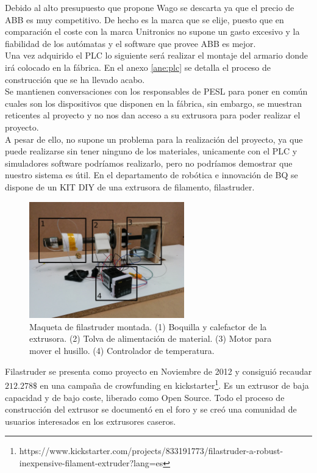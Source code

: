 Debido al alto presupuesto que propone Wago se descarta ya que el precio de ABB es muy competitivo. De hecho es la marca que se elije, puesto que en comparación el coste con la marca Unitronics no supone un gasto excesivo y la fiabilidad de los autómatas y el software que provee ABB es mejor.\\

Una vez adquirido el PLC lo siguiente será realizar el montaje del armario donde irá colocado en la fábrica. En el anexo \ref{ane:plc} se detalla el proceso de construcción que se ha llevado acabo.\\

Se mantienen conversaciones con los responsables de PESL para poner en común cuales son los dispositivos que disponen en la fábrica, sin embargo, se muestran reticentes al proyecto y no nos dan acceso a su extrusora para poder realizar el proyecto.\\

A pesar de ello, no supone un problema para la realización del proyecto, ya que puede realizarse sin tener ninguno de los materiales, unicamente con el PLC y simuladores software podríamos realizarlo, pero no podríamos demostrar que nuestro sistema es útil. En el departamento de robótica e innovación de BQ se dispone de un KIT DIY de una extrusora de filamento, filastruder.\\

    \begin{figure}[H]
            \centering
            \includegraphics[width=0.6\textwidth]{images/filaextruder/IMG_20150313_11163.jpg}
            \caption[Maqueta de filastruder montada]{Maqueta de filastruder montada. (1) Boquilla y calefactor de la extrusora. (2) Tolva de alimentación de material. (3) Motor para mover el husillo. (4) Controlador de temperatura.}
            \label{fig:hardware_filastruder}
    \end{figure}

Filastruder se presenta como proyecto en Noviembre de 2012 \cite{filastruder} y consiguió recaudar $212.278 \$$ en una campaña de crowfunding en kickstarter\footnote{https://www.kickstarter.com/projects/833191773/filastruder-a-robust-inexpensive-filament-extruder?lang=es}. Es un extrusor de baja capacidad y de bajo coste, liberado como Open Source. Todo el proceso de construcción del extrusor se documentó en el foro y se creó una comunidad de usuarios interesados en los extrusores caseros.\\

